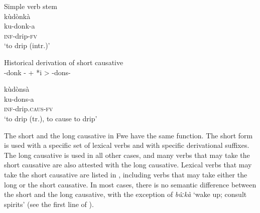 \ea
\label{bkm:Ref70067629}
\ea
Simple verb stem\\
kùdònkà\\
ku-donk-a\\
\textsc{inf}-drip-\textsc{fv}\\
\glt ‘to drip (intr.)’

\ex
\label{bkm:Ref70067630}
  Historical derivation of short causative\\
-donk - + *i > -dons-

\ex
\glll kùdònsà\\
ku-dons-a\\
\textsc{inf}-drip.\textsc{caus}-\textsc{fv}\\
\glt ‘to drip (tr.), to cause to drip’
\z\z

The short and the long causative in Fwe have the same function. The short form is used with a specific set of lexical verbs and with specific derivational suffixes. The long causative is used in all other cases, and many verbs that may take the short causative are also attested with the long causative. Lexical verbs that may take the short causative are listed in , including verbs that may take either the long or the short causative. In most cases, there is no semantic difference between the short and the long causative, with the exception of \textit{bûːkà} ‘wake up; consult spirits’ (see the first line of ).

